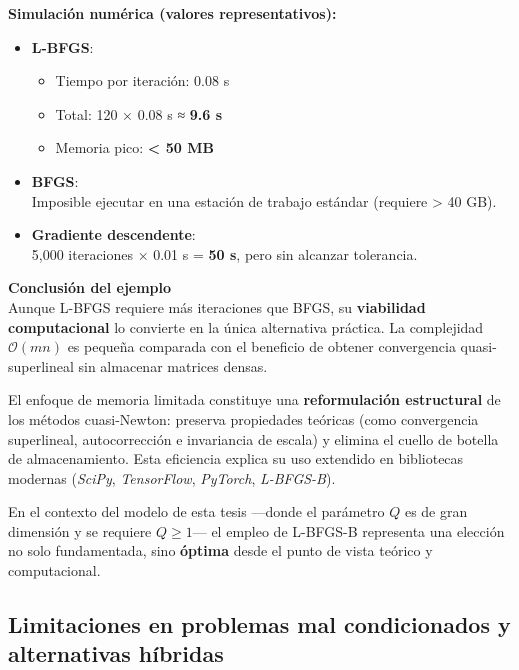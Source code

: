 \documentclass[
  spanish,
  us-letterpaper,
]{scrreprt}
\providecommand{\tightlist}{%
  \setlength{\itemsep}{0pt}\setlength{\parskip}{0pt}}
\numberwithin{equation}{section}
\begin{document}
\textbf{Simulación numérica (valores representativos):}

\begin{itemize}
\item
  \textbf{L-BFGS}:

  \begin{itemize}
  \tightlist
  \item
    Tiempo por iteración: 0.08 s\\
  \item
    Total: 120 × 0.08 s ≈ \textbf{9.6 s}\\
  \item
    Memoria pico: \textbf{\textless{} 50 MB}
  \end{itemize}
\item
  \textbf{BFGS}:\\
  Imposible ejecutar en una estación de trabajo estándar (requiere
  \textgreater{} 40 GB).
\item
  \textbf{Gradiente descendente}:\\
  5,000 iteraciones × 0.01 s = \textbf{50 s}, pero sin alcanzar
  tolerancia.
\end{itemize}

\textbf{Conclusión del ejemplo}\\
Aunque L-BFGS requiere más iteraciones que BFGS, su \textbf{viabilidad
computacional} lo convierte en la única alternativa práctica. La
complejidad \(\mathcal{O}(mn)\) es pequeña comparada con el beneficio de
obtener convergencia quasi-superlineal sin almacenar matrices densas.

El enfoque de memoria limitada constituye una \textbf{reformulación
estructural} de los métodos cuasi-Newton: preserva propiedades teóricas
(como convergencia superlineal, autocorrección e invariancia de escala)
y elimina el cuello de botella de almacenamiento. Esta eficiencia
explica su uso extendido en bibliotecas modernas (\emph{SciPy},
\emph{TensorFlow}, \emph{PyTorch}, \emph{L-BFGS-B}).

En el contexto del modelo de esta tesis ---donde el parámetro \(Q\) es
de gran dimensión y se requiere \(Q \ge 1\)--- el empleo de L-BFGS-B
representa una elección no solo fundamentada, sino \textbf{óptima} desde
el punto de vista teórico y computacional.

\subsection{Limitaciones en problemas mal condicionados y alternativas
híbridas}\label{limitaciones-en-problemas-mal-condicionados-y-alternativas-huxedbridas}
\end{document}
